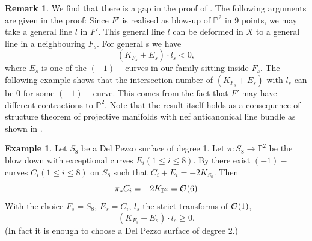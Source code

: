 \documentclass[a4, 12pt]{amsart}
\numberwithin{equation}{section}
\theoremstyle{definition}
\newtheorem{ex}[thm]{Example}
\newtheorem{rem}[thm]{Remark}
\def\P{\mathbb{P}}
\def\P{\mathbb{P}}
\begin{document}
\begin{rem}
We find that there is a gap in the proof of \cite[Proposition 0.4]{PS98}.
The following arguments are given in the proof:
Since $F'$ is realised as blow-up of $\P^2$ in 9 points, we may take a general line $l$ in $F'.$
This general line $l$ can be deformed in $X$ to a general line in a neighbouring $F_s$.
For general s we have
$$ (K_{F_s} + E_s) \cdot l_s < 0,$$
where $E_s$ is one of the $(-1)-$curves in our family sitting inside $F_s.$
The following example shows that the intersection number of $(K_{F_s} + E_s)$ with $l_s$ can be 0 for some $(-1)-$curve.
This comes from the fact that $F'$ may have different contractions to $\P^2$.
Note that the result itself holds as a consequence of structure theorem of projective manifolds with nef anticanonical line bundle as shown in \cite{CH19}.
\end{rem}

\begin{ex}
Let $S_8$ be a Del Pezzo surface of degree 1.
Let $\pi: S_8 \to \P^2$ be the blow down with exceptional curves $E_i(1 \leq i \leq 8)$.
By \cite[Proposition 8.2.19]{Dol09}
there exist $(-1)-$curves $C_i(1 \leq i \leq 8)$ on $S_8$ such that
$C_i+E_i=-2K_{S_8}$.
Then
$$\pi_* C_i=-2K_{\P^2}=\cO(6)$$
With the choice $F_s=S_8$, $E_s=C_i$, $l_s$ the strict transforms of $\mathcal{O}(1)$,
$$ (K_{F_s} + E_s) \cdot l_s \geq 0.$$
(In fact it is enough to choose a Del Pezzo surface of degree 2.)

\end{ex}
\end{document}
